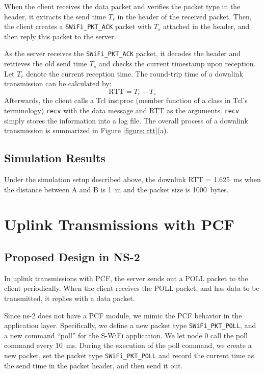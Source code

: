 \documentclass{article}
\begin{document}
When the client receives the data packet and verifies the packet type in the header, it extracts the send time $T_s$ in the header of the received packet. Then, the client creates a \lstinline|SWiFi_PKT_ACK| packet with $T_s$ attached in the header, and then reply this packet to the server.

As the server receives the \lstinline|SWiFi_PKT_ACK| packet, it decodes the header and retrieves the old send time $T_s$ and checks the current timestamp upon reception. Let $T_r$ denote the current reception time. The round-trip time of a downlink transmission can be calculated by:
\begin{equation}\label{equation: rtt}
\textrm{RTT}=T_r - T_s
\end{equation}
Afterwards, the client calls a Tcl instproc (member function of a class
in Tcl's terminology) \lstinline|recv| with the data message and RTT as the
arguments. \lstinline|recv| simply stores the information into a log file.
The overall process of a downlink transmission is summarized in Figure \ref{figure: rtt}(a). 

\subsection{Simulation Results}
Under the simulation setup described above, the downlink RTT = \SI{1.625}{ms} when the distance between A and B is \SI{1}{m} and the packet size is \SI{1000}{bytes}. 
\section{Uplink Transmissions with PCF}
\label{section: uplink}
\subsection{Proposed Design in NS-2}
In uplink transmissions with PCF, the server sends out a POLL packet to
the client periodically. When the client receives the POLL packet, and has data
to be transmitted, it replies with a data packet.

Since ns-2 does not have a PCF module, we mimic the PCF behavior in the
application layer. Specifically, we define a new packet type
\lstinline|SWiFi_PKT_POLL|, and a new command ``poll'' for the S-WiFi
application. We let node 0 call the poll command every \SI{10}{ms}.
During the execution of the poll command, we create a new packet, set the packet
type \lstinline|SWiFi_PKT_POLL| and record the current time as the send time in
the packet header, and then send it out.
\end{document}
